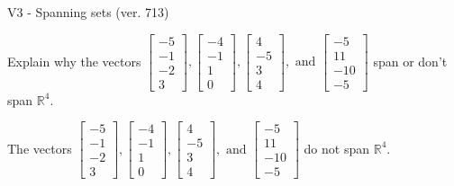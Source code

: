 \begin{exercise}
  \begin{exerciseTitle}V3 - Spanning sets (ver. 713)\end{exerciseTitle}
  \begin{exerciseStatement}
    Explain why the vectors \(\left[\begin{array}{r}
-5 \\
-1 \\
-2 \\
3
\end{array}\right] , \left[\begin{array}{r}
-4 \\
-1 \\
1 \\
0
\end{array}\right] , \left[\begin{array}{r}
4 \\
-5 \\
3 \\
4
\end{array}\right] , \text{ and } \left[\begin{array}{r}
-5 \\
11 \\
-10 \\
-5
\end{array}\right]\) span or don't span \(\mathbb{R}^4\). 
	


  \end{exerciseStatement}
  \begin{exerciseAnswer}
   The vectors \(\left[\begin{array}{r}
-5 \\
-1 \\
-2 \\
3
\end{array}\right] , \left[\begin{array}{r}
-4 \\
-1 \\
1 \\
0
\end{array}\right] , \left[\begin{array}{r}
4 \\
-5 \\
3 \\
4
\end{array}\right] , \text{ and } \left[\begin{array}{r}
-5 \\
11 \\
-10 \\
-5
\end{array}\right]\) 
  	 do not  
	span \(\mathbb{R}^4\).
  


  \end{exerciseAnswer}
\end{exercise}